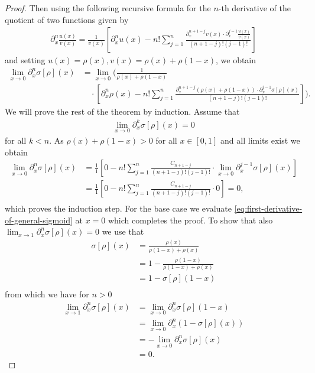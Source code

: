 \documentclass{article}
\begin{document}
\begin{proof}
    Then using the following recursive formula for the $n$-th derivative of the quotient of two functions given by \citet{xenophontos2007formula}
    \begin{align}
        \label{eq:xenophontos-formula}
        \partial^{n}_{x}\frac{u(x)}{v(x)} = \frac{1}{v(x)} \left[ \partial^{n}_{x} u(x) - n! \sum_{j=1}^{n} \frac{\partial^{n+1-j}_{x}v(x) \cdot \partial^{j-1}_{x} \frac{u(x)}{v(x)}}{(n+1-j)!(j-1)!} \right]
    \end{align}
    and setting $u(x) = \rho(x), v(x) = \rho(x) + \rho(1-x)$, we obtain
    \begin{align}
        \lim_{x \rightarrow 0} \partial^{n}_{x} \sigma[\rho](x) 
        &=  \lim_{x \rightarrow 0} \Bigg( \frac{1}{\rho(x) + \rho(1-x)} \\
        &\quad \cdot \left[ \partial^{n}_{x} \rho(x) - n! \sum_{j=1}^{n} \frac{\partial^{n+1-j}_{x}(\rho(x) + \rho(1-x)) \cdot \partial^{j-1}_{x} \sigma[\rho](x) }{(n+1-j)!(j-1)!} \right] \Bigg).
    \end{align}
    We will prove the rest of the theorem by induction. Assume that
    \begin{align}
        \lim_{x \rightarrow 0} \partial^{k}_{x} \sigma[\rho](x) = 0
    \end{align}
    for all $k < n$. As $\rho(x) + \rho(1-x) > 0$ for all $x \in [0, 1]$ and all limits exist we obtain
    \begin{align}
        \lim_{x \rightarrow 0} \partial^{n}_{x} \sigma[\rho](x) 
        &= \frac{1}{1} \left[0 - n! \sum_{j=1}^{n} \frac{C_{n+1-j}  }{(n+1-j)!(j-1)!} \cdot \lim_{x \rightarrow 0} \partial^{j-1}_{x} \sigma[\rho](x)\right] \\
        &= \frac{1}{1} \left[0 - n! \sum_{j=1}^{n} \frac{C_{n+1-j}  }{(n+1-j)!(j-1)!} \cdot 0\right] = 0, \\
    \end{align}
    which proves the induction step. For the base case we evaluate \eqref{eq:first-derivative-of-general-sigmoid} at $x=0$ which completes the proof. To show that also $\lim_{x \rightarrow 1}  \partial^{n}_{x}  \sigma[\rho](x) = 0$ we use that
    \begin{align}
        \sigma[\rho](x) &= \frac{\rho(x)}{\rho(1-x) + \rho(x)}\\
                        &= 1 - \frac{\rho(1-x)}{\rho(1-x) + \rho(x)} \\
                        &= 1 - \sigma[\rho](1-x) \\
    \end{align}
    from which we have for $n > 0$
    \begin{align}
        \lim_{x\rightarrow 1} \partial^{n}_{x} \sigma[\rho](x) 
        &= \lim_{x\rightarrow 0} \partial^{n}_{x} \sigma[\rho](1-x) \\
        &= \lim_{x\rightarrow 0} \partial^{n}_{x} (1-\sigma[\rho](x)) \\
        &= - \lim_{x\rightarrow 0} \partial^{n}_{x} \sigma[\rho](x) \\
        &= 0.
    \end{align}
\end{proof}
\end{document}

